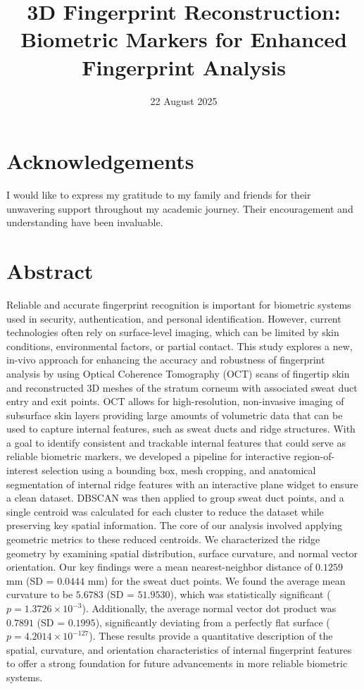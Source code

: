 \documentclass[12pt, twoside]{report}
\title{
    {3D Fingerprint Reconstruction: Biometric Markers for Enhanced Fingerprint Analysis}\\
}
\date{22 August 2025}
\begin{document}
%
\singlespacing



\chapter*{Acknowledgements}
I would like to express my gratitude to my family and friends for their unwavering support throughout my academic journey. Their encouragement and understanding have been invaluable.
\chapter*{Abstract}
Reliable and accurate fingerprint recognition is important for biometric systems used in security, authentication, and personal identification. However, current technologies often rely on surface-level imaging, which can be limited by skin conditions, environmental factors, or partial contact. This study explores a new, in-vivo approach for enhancing the accuracy and robustness of fingerprint analysis by using Optical Coherence Tomography (OCT) scans of fingertip skin and reconstructed 3D meshes of the stratum corneum with associated sweat duct entry and exit points. OCT allows for high-resolution, non-invasive imaging of subsurface skin layers providing large amounts of volumetric data that can be used to capture internal features, such as sweat ducts and ridge structures. With a goal to identify consistent and trackable internal features that could serve as reliable biometric markers, we developed a pipeline for interactive region-of-interest selection using a bounding box, mesh cropping, and anatomical segmentation of internal ridge features with an interactive plane widget to ensure a clean dataset. DBSCAN was then applied to group sweat duct points, and a single centroid was calculated for each cluster to reduce the dataset while preserving key spatial information. The core of our analysis involved applying geometric metrics to these reduced centroids. We characterized the ridge geometry by examining spatial distribution, surface curvature, and normal vector orientation. Our key findings were a mean nearest-neighbor distance of $0.1259$ mm (SD = $0.0444$ mm) for the sweat duct points. We found the average mean curvature to be $5.6783$ (SD = $51.9530$), which was statistically significant ($p = 1.3726 \times 10^{-3}$). Additionally, the average normal vector dot product was $0.7891$ (SD = $0.1995$), significantly deviating from a perfectly flat surface ($p = 4.2014 \times 10^{-127}$). These results provide a quantitative description of the spatial, curvature, and orientation characteristics of internal fingerprint features to offer a strong foundation for future advancements in more reliable biometric systems.
\tableofcontents
\listoftables
\listoffigures
\end{document}
